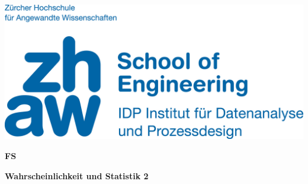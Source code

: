 \noindent
\begin{minipage}[t]{0.4\textwidth} 
\includegraphics[width=\linewidth]{logo.jpg}
\end{minipage}%
\hfill%
\begin{minipage}[t]{0.4\textwidth}\raggedleft
\textbf{\large FS \the\year}
\end{minipage}

\begin{center}
 \textbf{\large Wahrscheinlichkeit und Statistik 2} \\
 \vspace{0.3cm}
\end{center}

